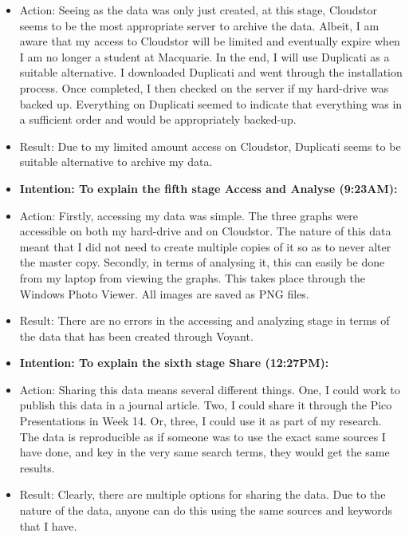 \documentclass[a4paper,12pt]{article}
\begin{document}
\begin{itemize}
\item Action: Seeing as the data was only just created, at this stage, Cloudstor seems to be the most appropriate server to archive the data. Albeit, I am aware that my access to Cloudstor will be limited and eventually expire when I am no longer a student at Macquarie. In the end, I will use Duplicati as a suitable alternative. I downloaded Duplicati and went through the installation process. Once completed, I then checked on the server if my hard-drive was backed up. Everything on Duplicati seemed to indicate that everything was in a sufficient order and would be appropriately backed-up. 


\item Result: Due to my limited amount access on Cloudstor, Duplicati seems to be suitable alternative to archive my data. 


\item \textbf{Intention: To explain the fifth stage Access and Analyse (9:23AM):}


\item Action: Firstly, accessing my data was simple. The three graphs were accessible on both my hard-drive and on Cloudstor. The nature of this data meant that I did not need to create multiple copies of it so as to never alter the master copy. Secondly, in terms of analysing it, this can easily be done from my laptop from viewing the graphs. This takes place through the Windows Photo Viewer. All images are saved as PNG files.


\item Result: There are no errors in the accessing and analyzing stage in terms of the data that has been created through Voyant. 


\item \textbf{Intention: To explain the sixth stage Share (12:27PM):}


\item Action: Sharing this data means several different things. One, I could work to publish this data in a journal article. Two, I could share it through the Pico Presentations in Week 14. Or, three, I could use it as part of my research. The data is reproducible as if someone was to use the exact same sources I have done, and key in the very same search terms, they would get the same results.


\item Result: Clearly, there are multiple options for sharing the data. Due to the nature of the data, anyone can do this using the same sources and keywords that I have. 



\end{itemize}
\end{document}
